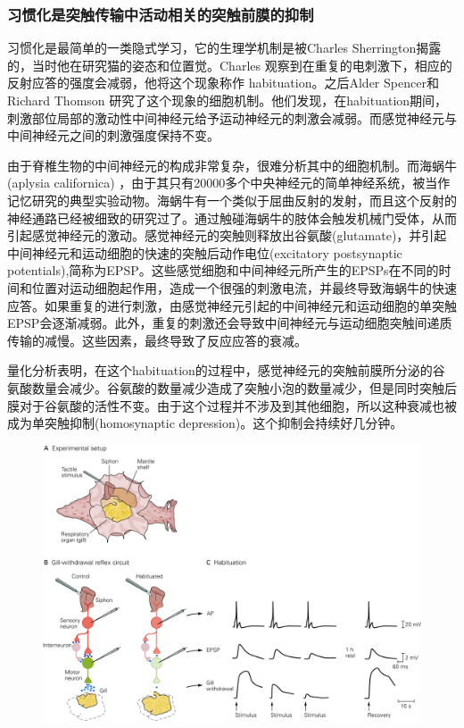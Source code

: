 \documentclass[UTF8,nofonts]{ctexart}
\begin{document}
\subsubsection{习惯化是突触传输中活动相关的突触前膜的抑制}
习惯化是最简单的一类隐式学习，它的生理学机制是被Charles Sherrington揭露的，当时他在研究猫的姿态和位置觉。Charles 观察到在重复的电刺激下，相应的反射应答的强度会减弱，他将这个现象称作 habituation。之后Alder Spencer和Richard Thomson 研究了这个现象的细胞机制。他们发现，在habituation期间，刺激部位局部的激动性中间神经元给予运动神经元的刺激会减弱。而感觉神经元与中间神经元之间的刺激强度保持不变。
\par
由于脊椎生物的中间神经元的构成非常复杂，很难分析其中的细胞机制。而海蜗牛(aplysia californica) ，由于其只有20000多个中央神经元的简单神经系统，被当作记忆研究的典型实验动物。海蜗牛有一个类似于屈曲反射的发射，而且这个反射的神经通路已经被细致的研究过了。通过触碰海蜗牛的肢体会触发机械门受体，从而引起感觉神经元的激动。感觉神经元的突触则释放出谷氨酸(glutamate)，并引起中间神经元和运动细胞的快速的突触后动作电位(excitatory postsynaptic potentials),简称为EPSP。这些感觉细胞和中间神经元所产生的EPSPs在不同的时间和位置对运动细胞起作用，造成一个很强的刺激电流，并最终导致海蜗牛的快速应答。如果重复的进行刺激，由感觉神经元引起的中间神经元和运动细胞的单突触EPSP会逐渐减弱。此外，重复的刺激还会导致中间神经元与运动细胞突触间递质传输的减慢。这些因素，最终导致了反应应答的衰减。
\par
量化分析表明，在这个habituation的过程中，感觉神经元的突触前膜所分泌的谷氨酸数量会减少。谷氨酸的数量减少造成了突触小泡的数量减少，但是同时突触后膜对于谷氨酸的活性不变。由于这个过程并不涉及到其他细胞，所以这种衰减也被成为单突触抑制(homosynaptic depression)。这个抑制会持续好几分钟。
\begin{figure}[h]
	\centering
	\includegraphics[scale=0.8]{Pic/6602_PNS5.jpg}
\end{figure}
\end{document}

